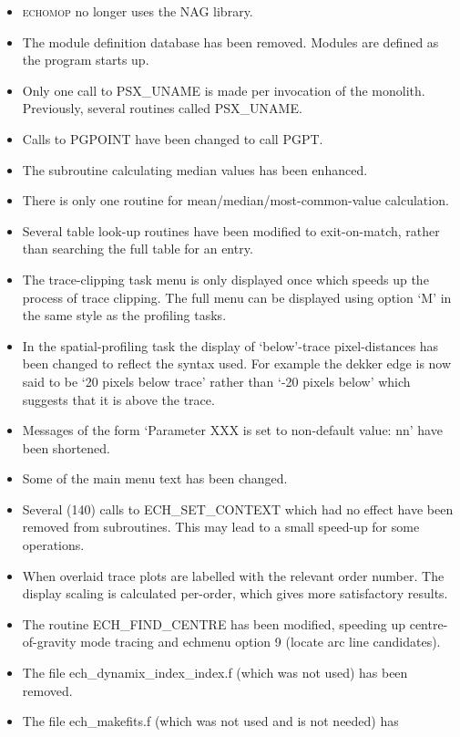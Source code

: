 \documentclass[twoside,11pt,nolof]{starlink}
\begin{document}
\begin{itemize}
\item \textsc{echomop} no longer uses the NAG library.
\item The module definition database has been removed.  Modules are defined
   as the program starts up.
\item Only one call to PSX\_UNAME is made per invocation of the monolith.
   Previously, several routines called PSX\_UNAME.
\item Calls to PGPOINT have been changed to call PGPT.
\item The subroutine calculating median values has been enhanced.
\item There is only one routine for mean/median/most-common-value
   calculation.
\item Several table look-up routines have been modified to exit-on-match,
   rather than searching the full table for an entry.
\item The trace-clipping task menu is only displayed once which speeds
   up the process of trace clipping.  The full menu can be displayed
   using option `M' in the same style as the profiling tasks.
\item In the spatial-profiling task the display of `below'-trace
   pixel-distances has been changed to reflect the syntax used.  For
   example the dekker edge is now said to be `20 pixels below trace'
   rather than `-20 pixels below' which suggests that it is above the
   trace.
\item Messages of the form `Parameter XXX is set to non-default value: nn'
   have been shortened.
\item Some of the main menu text has been changed.
\item Several (140) calls to ECH\_SET\_CONTEXT which had no effect have been
   removed from subroutines.  This may lead to a small speed-up for
   some operations.
\item When  overlaid trace plots are
   labelled with the relevant
   order number.  The display scaling is calculated per-order, which gives
   more satisfactory results.
\item The routine ECH\_FIND\_CENTRE has been modified, speeding up
   centre-of-gravity mode tracing and echmenu option 9 (locate arc line
   candidates).
\item The file ech\_dynamix\_index\_index.f (which was not used) has been
   removed.
\item The file ech\_makefits.f (which was not used and is not needed) has

\end{itemize}
\end{document}
